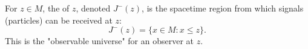 For $z \in M$, the  of $z$, denoted $J^-(z)$, is the spacetime region from which signals (particles) can be received at $z$:
$$
J^-(z) = \{ x \in M : x \leq z \}.
$$
This is the "observable universe" for an observer at $z$.

